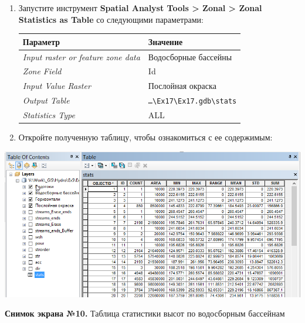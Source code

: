 \documentclass[]{book}
\theoremstyle{definition}
\theoremstyle{definition}
\theoremstyle{definition}
\theoremstyle{remark}
\begin{document}
\begin{enumerate}
\def\labelenumi{\arabic{enumi}.}
\item
  Запустите инструмент \textbf{Spatial Analyst Tools \textgreater{}
  Zonal \textgreater{} Zonal Statistics as Table} со следующими
  параметрами:

  \begin{longtable}[]{@{}ll@{}}
  \toprule
  Параметр & Значение\tabularnewline
  \midrule
  \endhead
  \emph{Input raster or feature zone data} & Водосборные
  бассейны\tabularnewline
  \emph{Zone Field} & Id\tabularnewline
  \emph{Input Value Raster} & Послойная окраска\tabularnewline
  \emph{Output Table} &
  \texttt{\ldots{}\textbackslash{}Ex17\textbackslash{}Ex17.gdb\textbackslash{}stats}\tabularnewline
  \emph{Statistics Type} & ALL\tabularnewline
  \bottomrule
  \end{longtable}
\item
  Откройте полученную таблицу, чтобы ознакомиться с ее содержимым:
\end{enumerate}

\includegraphics{images/Ex17/image26.png}

\textbf{Снимок экрана №10.} Таблица статистики высот по водосборным
бассейнам
\end{document}
